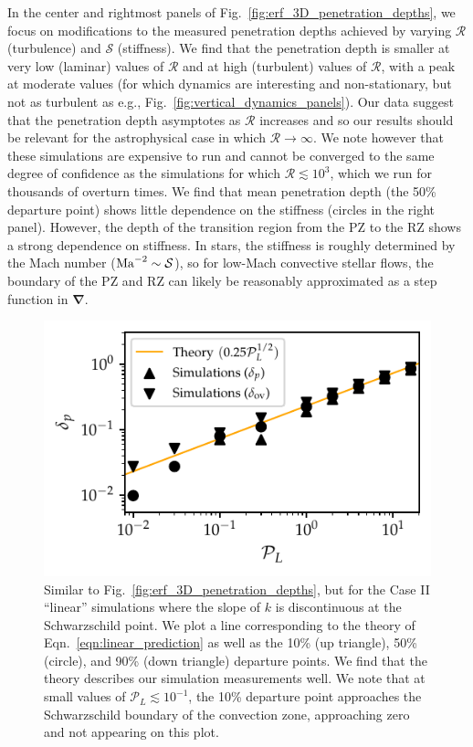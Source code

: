 \documentclass{aastex631}
\newcommand{\mP}{\ensuremath{\mathcal{P}}}
\newcommand{\mR}{\ensuremath{\mathcal{R}}}
\newcommand{\mS}{\ensuremath{\mathcal{S}}}
\renewcommand{\vec}[1]{\boldsymbol{#1}}
\newcommand{\grad}{\vec{\nabla}}
\begin{document}
In the center and rightmost panels of Fig.~\ref{fig:erf_3D_penetration_depths}, we focus on modifications to the measured penetration depths achieved by varying $\mR$ (turbulence) and $\mS$ (stiffness).
We find that the penetration depth is smaller at very low (laminar) values of $\mR$ and at high (turbulent) values of $\mR$, with a peak at moderate values (for which dynamics are interesting and non-stationary, but not as turbulent as e.g., Fig.~\ref{fig:vertical_dynamics_panels}).
Our data suggest that the penetration depth asymptotes as $\mR$ increases and so our results should be relevant for the astrophysical case in which $\mR \rightarrow \infty$.
We note however that these simulations are expensive to run and cannot be converged to the same degree of confidence as the simulations for which $\mR \lesssim 10^3$, which we run for thousands of overturn times.
We find that mean penetration depth (the 50\% departure point) shows little dependence on the stiffness (circles in the right panel).
However, the depth of the transition region from the PZ to the RZ shows a strong dependence on stiffness.
In stars, the stiffness is roughly determined by the Mach number ($\rm{Ma}^{-2} \sim \mS$), so for low-Mach convective stellar flows, the boundary of the PZ and RZ can likely be reasonably approximated as a step function in $\grad$.

\begin{figure}[t!]
\centering
\includegraphics{linear_3D_penetration_depths.pdf}
\caption{
Similar to Fig.~\ref{fig:erf_3D_penetration_depths}, but for the Case II ``linear'' simulations where the slope of $k$ is discontinuous at the Schwarzschild point.
We plot a line corresponding to the theory of Eqn.~\ref{eqn:linear_prediction} as well as the 10\% (up triangle), 50\% (circle), and 90\% (down triangle) departure points.
We find that the theory describes our simulation measurements well.
We note that at small values of $\mP_L \lesssim 10^{-1}$, the 10\% departure point approaches the Schwarzschild boundary of the convection zone, approaching zero and not appearing on this plot.
\label{fig:linear_3D_penetration_depths}
}
\end{figure}
\end{document}
